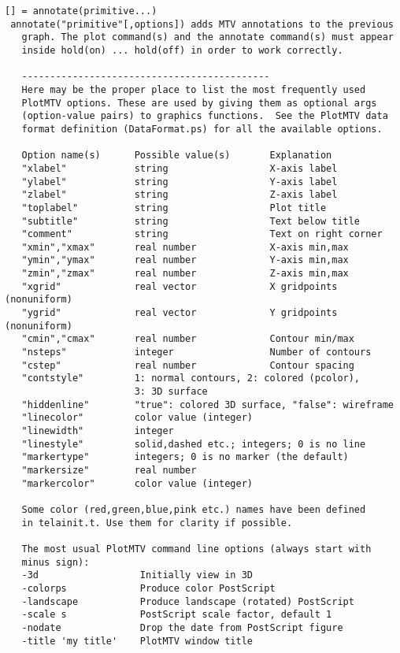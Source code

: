 \documentclass[a4paper]{article}
\begin{document}
\begin{tscreen}
\begin{verbatim}
[] = annotate(primitive...)
 annotate("primitive"[,options]) adds MTV annotations to the previous
   graph. The plot command(s) and the annotate command(s) must appear
   inside hold(on) ... hold(off) in order to work correctly.
   
   --------------------------------------------
   Here may be the proper place to list the most frequently used
   PlotMTV options. These are used by giving them as optional args
   (option-value pairs) to graphics functions.  See the PlotMTV data
   format definition (DataFormat.ps) for all the available options.
   
   Option name(s)      Possible value(s)       Explanation
   "xlabel"            string                  X-axis label
   "ylabel"            string                  Y-axis label
   "zlabel"            string                  Z-axis label
   "toplabel"          string                  Plot title
   "subtitle"          string                  Text below title
   "comment"           string                  Text on right corner
   "xmin","xmax"       real number             X-axis min,max
   "ymin","ymax"       real number             Y-axis min,max
   "zmin","zmax"       real number             Z-axis min,max
   "xgrid"             real vector             X gridpoints (nonuniform)
   "ygrid"             real vector             Y gridpoints (nonuniform)
   "cmin","cmax"       real number             Contour min/max
   "nsteps"            integer                 Number of contours
   "cstep"             real number             Contour spacing
   "contstyle"         1: normal contours, 2: colored (pcolor),
                       3: 3D surface
   "hiddenline"        "true": colored 3D surface, "false": wireframe
   "linecolor"         color value (integer)
   "linewidth"         integer
   "linestyle"         solid,dashed etc.; integers; 0 is no line
   "markertype"        integers; 0 is no marker (the default)
   "markersize"        real number
   "markercolor"       color value (integer)
   
   Some color (red,green,blue,pink etc.) names have been defined
   in telainit.t. Use them for clarity if possible.
   
   The most usual PlotMTV command line options (always start with
   minus sign):
   -3d                  Initially view in 3D
   -colorps             Produce color PostScript
   -landscape           Produce landscape (rotated) PostScript
   -scale s             PostScript scale factor, default 1
   -nodate              Drop the date from PostScript figure
   -title 'my title'    PlotMTV window title
   

\end{verbatim}
\end{tscreen}
\end{document}
